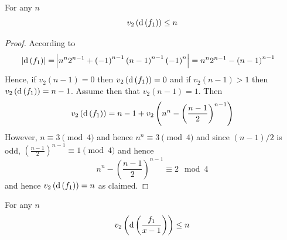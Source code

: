 \documentclass[../main.tex]{subfiles}
\begin{document}
\begin{lemma}
  For any $n$ 
  \[
  v_2\left( \operatorname{\rm d}\left( f_1 \right) \right) \leq n
  \]
\end{lemma}
\begin{proof}
  According to \cite[Theorem 2]{Swan62} 
  \begin{align*}
    \left| \operatorname{\rm d}\left( f_1 \right) \right| = &
    \left|  
      n^n 2^{n-1} + \left( -1 \right)^{n-1} \left( n-1 \right)^{n-1}\left( -1 \right)^n
    \right| = n^n 2^{n-1} - \left( n-1 \right)^{n-1}
  \end{align*}
  Hence, if $v_2\left( n-1 \right) = 0$ then $v_2\left( \operatorname{\rm d}\left( f_1 \right) \right) = 0$ and if $v_2\left( n-1 \right) > 1$ then $v_2\left( \operatorname{\rm d}\left( f_1 \right) \right) = n - 1$.
  Assume then that $v_2\left( n-1 \right) = 1$.
  Then 
  \[
    v_2\left( \operatorname{\rm d}\left( f_1 \right) \right) = 
    n - 1 + v_2\left(  
      n^n - \left( \frac{n-1}{2} \right)^{n-1}
    \right)
  \]
  However, $n \equiv 3 \pmod{4}$ and hence $n^n \equiv 3 \pmod{4}$ and since $\left( n-1 \right) / 2$ is odd, $\left( \frac{n-1}{2} \right)^{n-1} \equiv 1 \pmod{4}$ and hence 
  \[
    n^n - \left( \frac{n-1}{2} \right)^{n-1} \equiv 2 \mod 4
  \]
  and hence $v_2\left( \operatorname{\rm d}\left( f_1 \right) \right) = n$ as claimed.
\end{proof}
\begin{lemma}
  For any $n$ 
  \[
  v_2\left( \operatorname{\rm d}\left( \frac{f_1}{x - 1} \right) \right) \leq n
  \]
\end{lemma}
\end{document}
